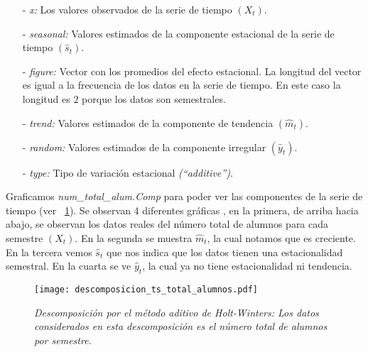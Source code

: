 \begin{itemize}
\item[-] \textit{x:} Los valores observados de la serie de tiempo $(X_{t})$.

\item[-] \textit{seasonal:} Valores estimados de la componente estacional de la serie de tiempo $(\hat{s}_{t})$.

\item[-] \textit{figure:} Vector con los promedios del efecto estacional. La longitud del vector es igual a la frecuencia de los datos en la serie de tiempo. En este caso la longitud es $2$ porque los datos son semestrales.

\item[-] \textit{trend:} Valores estimados de la componente de tendencia $(\hat{m}_{t})$.

\item[-] \textit{random:} Valores estimados de la componente irregular $(\hat{y}_{t})$.

\item[-] \textit{type:} Tipo de variación estacional \textit{(``additive'')}.
\end{itemize}


Graficamos \textit{num\_total\_alum.Comp} para poder ver las componentes de la serie de tiempo (ver \figurename{~\ref{img_en_ing_2}}). Se observan 4 diferentes gráficas , en la primera, de arriba hacia abajo, se observan los datos reales del número total de alumnos para cada semestre $(X_{t})$. En la segunda se muestra $\hat{m}_{t}$, la cual notamos que es creciente. En la tercera vemos $\hat{s}_{t}$ que nos indica que los datos tienen una estacionalidad semestral. En la cuarta se ve $\hat{y}_{t}$, la cual ya no tiene estacionalidad ni tendencia.

\begin{figure}[H]
\centering
\texttt{[image: descomposicion\_ts\_total\_alumnos.pdf]} %
\caption[\textit{Descomposición por el método aditivo de Holt-Winters}]{\textit{Descomposición por el método aditivo de Holt-Winters: Los datos considerados en esta descomposición es el número total de alumnos por semestre.}}\label{img_en_ing_2}
\end{figure}

